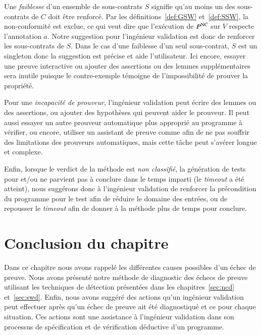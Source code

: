 Une \emph{faiblesse} d'un ensemble de sous-contrats $S$ signifie qu'au moins un
des sous-contrats de $C$ doit être renforcé.
Par les définitions~\ref{def:GSW} et~\ref{def:SSW}, la non-conformité est
exclue, ce qui veut dire que l'exécution de $P^{\mathrm{NC}}$ sur $V$ respecte
l'annotation $a$.
Notre suggestion pour l'ingénieur validation est donc de renforcer les
sous-contrats de $S$.
Dans le cas d'une faiblesse d'un seul sous-contrat, $S$ est un singleton donc
la suggestion est précise et aide l'utilisateur.
Ici encore, essayer une preuve interactive ou ajouter des assertions ou des
lemmes supplémentaires sera inutile puisque le contre-exemple témoigne de
l'impossibilité de prouver la propriété.

Pour une \emph{incapacité de prouveur}, l'ingénieur validation peut écrire des
lemmes ou des assertions, ou ajouter des hypothèses qui peuvent aider le
prouveur.
Il peut aussi essayer un autre prouveur automatique plus approprié au programme
à vérifier, ou encore, utiliser un assistant de preuve comme \coq afin de ne
pas souffrir des limitations des prouveurs automatiques, mais cette tâche peut
s'avérer longue et complexe.

Enfin, lorsque le verdict de la méthode est \emph{non classifié}, la génération
de tests pour \NCD et/ou \SWD ne parvient pas à conclure dans le temps imparti
(le {\em timeout} a été atteint), nous suggérons donc à l'ingénieur validation
de renforcer la précondition du programme pour le test afin de réduire le
domaine des entrées, ou de repousser le {\em timeout} afin de donner à la
méthode plus de temps pour conclure.


\section*{Conclusion du chapitre}


Dans ce chapitre nous avons rappelé les différentes causes possibles d'un échec
de preuve.
Nous avons présenté notre méthode de diagnostic des échecs de
preuve utilisant les techniques de détection présentées dans les
chapitres~\ref{sec:ncd} et~\ref{sec:swd}.
Enfin, nous avons suggéré des actions qu'un ingénieur validation peut effectuer
après qu'un échec de preuve ait été diagnostiqué et ce pour chaque situation.
Ces actions sont une assistance à l'ingénieur validation dans son processus de
spécification et de vérification déductive d'un programme.
